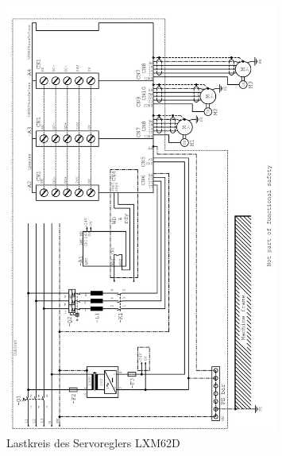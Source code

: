 \documentclass[../../../Bachelorarbeit.tex]{subfiles}
\begin{document}
\begin{figure}[H]
    \centering
    \includegraphics[width=0.8\textwidth]{Images/lastkreis.jpg}
    \caption[Lastkreis Servoregler]{Lastkreis des Servoreglers LXM62D}
    \label{fig:my-img102}
\end{figure}
\end{document}
